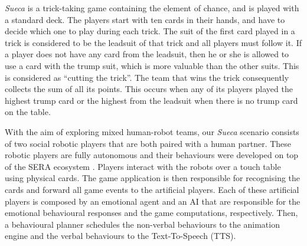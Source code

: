 \textit{Sueca} is a trick-taking game containing the element of chance, and is played with a standard deck. The players start with ten cards in their hands, and have to decide which one to play during each trick. The suit of the first card played in a trick is considered to be the leadsuit of that trick and all players must follow it. If a player does not have any card from the leadsuit, then he or she is allowed to use a card with the trump suit, which is more valuable than the other suits. This is considered as ``cutting the trick''. The team that wins the trick consequently collects the sum of all its points. This occurs when any of its players played the highest trump card or the highest from the leadsuit when there is no trump card on the table.

With the aim of exploring mixed human-robot teams, our \textit{Sueca} scenario consists of two social robotic players that are both paired with a human partner. These robotic players are fully autonomous and their behaviours were developed on top of the SERA ecosystem \cite{ribeiro2016sera}. Players interact with the robots over a touch table using physical cards. The game application is then responsible for recognising the cards and forward all game events to the artificial players. Each of these artificial players is composed by an emotional agent \cite{dias2014fatima} and an AI \cite{correia2017asocial} that are responsible for the emotional behavioural responses and the game computations, respectively. Then, a behavioural planner schedules the non-verbal behaviours to the animation engine and the verbal behaviours to the Text-To-Speech (TTS).


